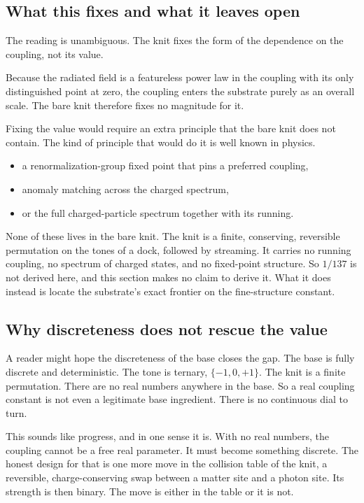 \subsection{What this fixes and what it leaves open}

The reading is unambiguous. The knit fixes the form of the dependence on the coupling, not its value.

\begin{proposition}
Because the radiated field is a featureless power law in the coupling with its only distinguished point at zero, the coupling enters the substrate purely as an overall scale. The bare knit therefore fixes no magnitude for it.
\end{proposition}

Fixing the value would require an extra principle that the bare knit does not contain. The kind of principle that would do it is well known in physics.

\begin{itemize}
\item a renormalization-group fixed point that pins a preferred coupling,
\item anomaly matching across the charged spectrum,
\item or the full charged-particle spectrum together with its running.
\end{itemize}

None of these lives in the bare knit. The knit is a finite, conserving, reversible permutation on the tones of a dock, followed by streaming. It carries no running coupling, no spectrum of charged states, and no fixed-point structure. So $1/137$ is not derived here, and this section makes no claim to derive it. What it does instead is locate the substrate's exact frontier on the fine-structure constant.

\subsection{Why discreteness does not rescue the value}

A reader might hope the discreteness of the base closes the gap. The base is fully discrete and deterministic. The tone is ternary, $\{-1,0,+1\}$. The knit is a finite permutation. There are no real numbers anywhere in the base. So a real coupling constant is not even a legitimate base ingredient. There is no continuous dial to turn.

This sounds like progress, and in one sense it is. With no real numbers, the coupling cannot be a free real parameter. It must become something discrete. The honest design for that is one more move in the collision table of the knit, a reversible, charge-conserving swap between a matter site and a photon site. Its strength is then binary. The move is either in the table or it is not.

